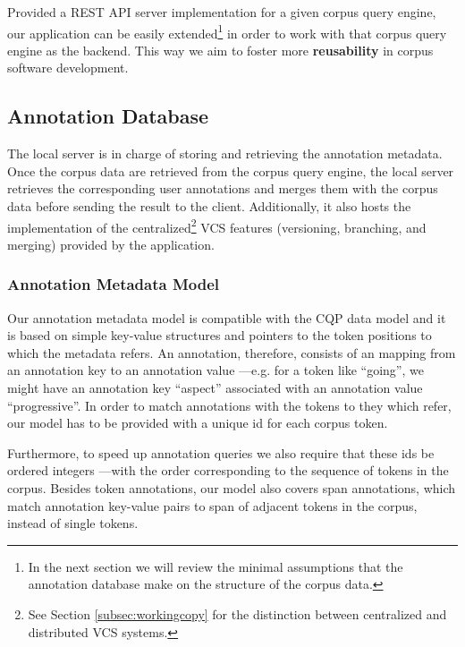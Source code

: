 \documentclass{sig-alternate}
\begin{document}
Provided a REST API server implementation for a given corpus query engine, our application can
be easily extended\footnote{
  In the next section we will review the minimal assumptions that the annotation database make on
the structure of the corpus data.
} in order to work with that corpus query engine as the backend. This way we aim to foster 
more \textbf{reusability} in corpus software development.

\subsection{Annotation Database}\label{subsec:db}
The local server is in charge of storing and retrieving the annotation metadata. Once the corpus data
are retrieved from the corpus query engine, the local server retrieves the corresponding user
annotations and merges them with the corpus data before sending the result to the client.
Additionally, it also hosts the implementation of the centralized\footnote{
  See Section \ref{subsec:workingcopy} for the distinction between centralized and distributed
  VCS systems.
} VCS features (versioning, branching, and merging) provided by the application.

\subsubsection{Annotation Metadata Model}\label{subsec:datamodel}

Our annotation metadata model is compatible with the CQP data model \cite{Christ1999} and
it is based on simple key-value structures and pointers to the token
positions to which the metadata refers. An annotation, therefore, consists of an mapping from
an annotation key to an annotation value ---e.g. for a token like ``going'', we might
have an annotation key ``aspect'' associated with an annotation value ``progressive''.
In order to match annotations with the tokens to they which refer, our model has to be provided
with a unique id for each corpus token.

Furthermore, to speed up annotation queries we also require that these ids be ordered integers
---with the order corresponding to the sequence of tokens in the corpus.
Besides token annotations, our model also covers span annotations, which match annotation
key-value pairs to span of adjacent tokens in the corpus, instead of single tokens.

\end{document}
